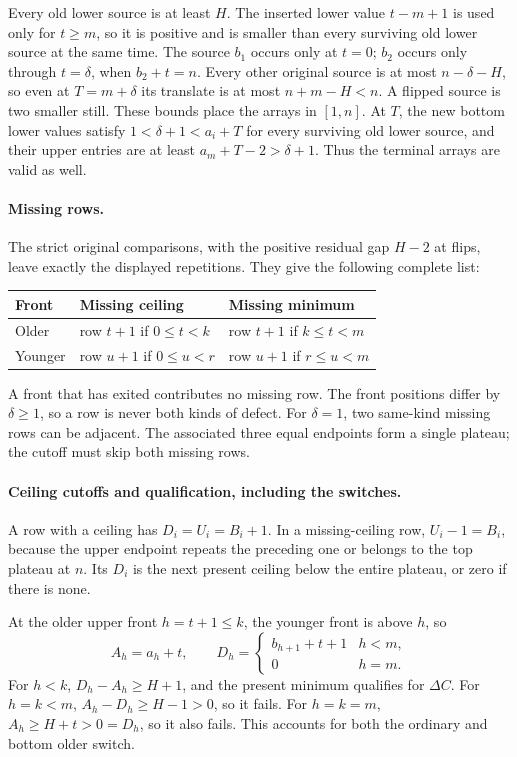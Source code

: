 Every old lower source is at least $H$. The inserted lower value $t-m+1$ is used only for $t\ge m$, so it is positive and is smaller than every surviving old lower source at the same time. The source $b_1$ occurs only at $t=0$; $b_2$ occurs only through $t=\delta$, when $b_2+t=n$. Every other original source is at most $n-\delta-H$, so even at $T=m+\delta$ its translate is at most $n+m-H<n$. A flipped source is two smaller still. These bounds place the arrays in $[1,n]$. At $T$, the new bottom lower values satisfy $1<\delta+1<a_i+T$ for every surviving old lower source, and their upper entries are at least $a_m+T-2>\delta+1$. Thus the terminal arrays are valid as well.

\paragraph{Missing rows.}
The strict original comparisons, with the positive residual gap $H-2$ at flips, leave exactly the displayed repetitions. They give the following complete list:
\begin{center}
\begin{tabular}{lll}
\toprule
Front & Missing ceiling & Missing minimum\\
\midrule
Older & row $t+1$ if $0\le t<k$ & row $t+1$ if $k\le t<m$\\
Younger & row $u+1$ if $0\le u<r$ & row $u+1$ if $r\le u<m$\\
\bottomrule
\end{tabular}
\end{center}
A front that has exited contributes no missing row. The front positions differ by $\delta\ge1$, so a row is never both kinds of defect. For $\delta=1$, two same-kind missing rows can be adjacent. The associated three equal endpoints form a single plateau; the cutoff must skip both missing rows.

\paragraph{Ceiling cutoffs and qualification, including the switches.}
A row with a ceiling has $D_i=U_i=B_i+1$. In a missing-ceiling row, $U_i-1=B_i$, because the upper endpoint repeats the preceding one or belongs to the top plateau at $n$. Its $D_i$ is the next present ceiling below the entire plateau, or zero if there is none.

At the older upper front $h=t+1\le k$, the younger front is above $h$, so
\[
 A_h=a_h+t,\qquad
 D_h=\begin{cases}b_{h+1}+t+1&h<m,\\0&h=m.\end{cases}
\]
For $h<k$, $D_h-A_h\ge H+1$, and the present minimum qualifies for $\Delta C$. For $h=k<m$, $A_h-D_h\ge H-1>0$, so it fails. For $h=k=m$, $A_h\ge H+t>0=D_h$, so it also fails. This accounts for both the ordinary and bottom older switch.

